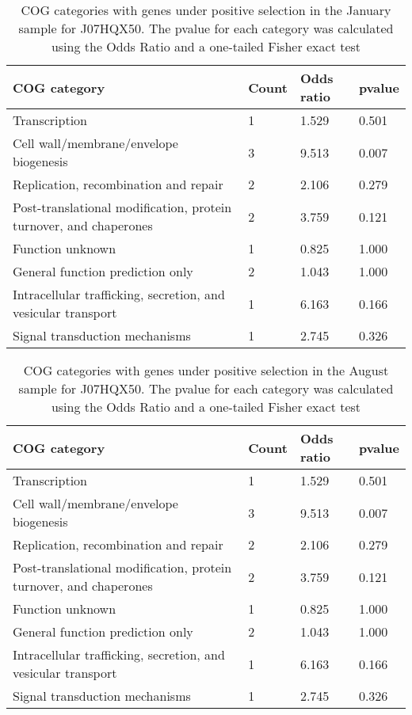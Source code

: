\begin{table}[]
\footnotesize 
	\tabcolsep=0.11cm 
\caption{COG categories with genes under positive selection in the January sample for J07HQX50. The pvalue for each category was calculated using the Odds Ratio and a one-tailed Fisher exact test} 
\begin{tabularx}{\textwidth}{L{6cm}R{2cm}R{2cm}R{2cm}} 
\hline 
\textbf{COG category} & \textbf{Count} & \textbf{Odds ratio} & \textbf{pvalue} \\ 
\hline 
Transcription & 1 & 1.529 & 0.501 \\ 
Cell wall/membrane/envelope biogenesis & 3 & 9.513 & 0.007 \\ 
Replication, recombination and repair & 2 & 2.106 & 0.279 \\ 
Post-translational modification, protein turnover, and chaperones & 2 & 3.759 & 0.121 \\ 
Function unknown & 1 & 0.825 & 1.000 \\ 
General function prediction only & 2 & 1.043 & 1.000 \\ 
Intracellular trafficking, secretion, and vesicular transport & 1 & 6.163 & 0.166 \\ 
Signal transduction mechanisms & 1 & 2.745 & 0.326 \\ 
\end{tabularx} 
\label{January_COG_Selection_J07HQX50} 
 \end{table} 

\begin{table}[hb]
\footnotesize 
	\tabcolsep=0.11cm 
\caption{COG categories with genes under positive selection in the August sample for J07HQX50. The pvalue for each category was calculated using the Odds Ratio and a one-tailed Fisher exact test} 
\begin{tabularx}{\textwidth}{L{6cm}R{2cm}R{2cm}R{2cm}} 
\hline 
\textbf{COG category} & \textbf{Count} & \textbf{Odds ratio} & \textbf{pvalue} \\ 
\hline 
Transcription & 1 & 1.529 & 0.501 \\ 
Cell wall/membrane/envelope biogenesis & 3 & 9.513 & 0.007 \\ 
Replication, recombination and repair & 2 & 2.106 & 0.279 \\ 
Post-translational modification, protein turnover, and chaperones & 2 & 3.759 & 0.121 \\ 
Function unknown & 1 & 0.825 & 1.000 \\ 
General function prediction only & 2 & 1.043 & 1.000 \\ 
Intracellular trafficking, secretion, and vesicular transport & 1 & 6.163 & 0.166 \\ 
Signal transduction mechanisms & 1 & 2.745 & 0.326 \\ 
\end{tabularx} 
\label{August_COG_Selection_J07HQX50} 
 \end{table} 

